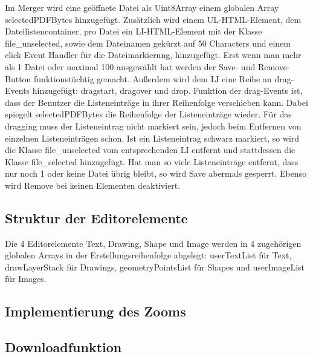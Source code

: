 Im Merger wird eine geöffnete Datei als Uint8Array einem globalen Array selectedPDFBytes hinzugefügt. Zusätzlich wird einem UL-HTML-Element, dem Dateilistencontainer, pro Datei ein LI-HTML-Element mit der Klasse file\_unselected, sowie dem Dateinamen gekürzt auf 50 Characters und einem click Event Handler für die Dateimarkierung, hinzugefügt. Erst wenn man mehr als 1 Datei oder maximal 100 ausgewählt hat werden der Save- und Remove-Button funktionstüchtig gemacht. Außerdem wird dem LI eine Reihe an drag-Events hinzugefügt: dragstart, dragover und drop. Funktion der drag-Events ist, dass der Benutzer die Listeneinträge in ihrer Reihenfolge verschieben kann. Dabei spiegelt selectedPDFBytes die Reihenfolge der Listeneinträge wieder. Für das dragging muss der Listeneintrag nicht markiert sein, jedoch beim Entfernen von einzelnen Listeneinträgen schon. Ist ein Listeneintrag schwarz markiert, so wird die Klasse file\_unselected vom entsprechenden LI entfernt und stattdessen die Klasse file\_selected hinzugefügt. Hat man so viele Listeneinträge entfernt, dass nur noch 1 oder keine Datei übrig bleibt, so wird Save abermals gesperrt. Ebenso wird Remove bei keinen Elementen deaktiviert.

\subsection{Struktur der Editorelemente}
Die 4 Editorelemente Text, Drawing, Shape und Image werden in 4 zugehörigen globalen Arrays in der Erstellungsreihenfolge abgelegt: userTextList für Text, drawLayerStack für Drawings, geometryPointsList für Shapes und userImageList für Images.


\subsection{Implementierung des Zooms}

\subsection{Downloadfunktion}
